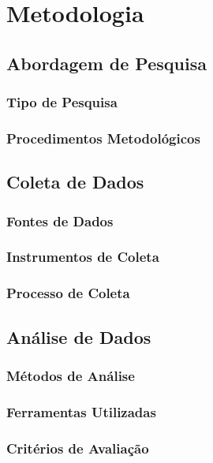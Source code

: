 

\newcommand{\sla}{\textbackslash}

\newcommand{\cmd}[1]{\textsf{#1}}

\newcommand{\pkg}[1]{\textsf{#1}}

\newcommand{\ltxcmd}[1]{\cmd{\sla{}#1}}

\chapter{Metodologia}%
\label{cap:metodologia}

\section{Abordagem de Pesquisa}
\subsection{Tipo de Pesquisa}
\subsection{Procedimentos Metodológicos}

\section{Coleta de Dados}
\subsection{Fontes de Dados}
\subsection{Instrumentos de Coleta}
\subsection{Processo de Coleta}

\section{Análise de Dados}
\subsection{Métodos de Análise}
\subsection{Ferramentas Utilizadas}
\subsection{Critérios de Avaliação}
